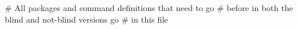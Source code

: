 # All packages and command definitions that need to go
# before  in both the blind and not-blind versions go
# in this file

\usepackage{subfigure}
\newcommand{\ignore}[1]{}
